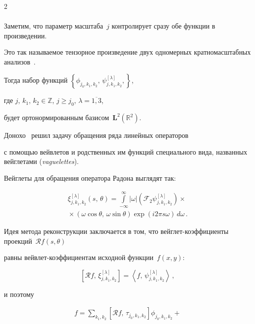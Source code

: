 \begin{multicols}{2}
\begin{align*}
\end{align*}


Заметим, что параметр масштаба~$j$ контролирует сразу обе функции в произведении. 


Это так называемое тензорное произведение двух одномерных кратномасштабных анализов~\cite{Daub}. 


Тогда набор функций $\left\{ \phi_{j_0,k_1,k_2}, \, \psi^{[\lambda]}_{j,k_1,k_2}, \right\}$, 


где $j$, $k_1$, $k_2\in\mathbb{Z}$, $j\geq j_0$, $\lambda=\overline{1,3}$, 


будет ортонормированным базисом~$\mathbf{L}^2(\mathbb{R}^2)$.





Донохо~\cite{DonohoWVD} решил задачу обращения ряда линейных операторов 


с помощью вейвлетов и родственных им функций специального вида, названных вейглетами (\textit{vaguelettes}). 


Вейглеты для обращения оператора Радона выглядят так:


\begin{multline*}


\xi^{[\lambda]}_{j,k_1,k_2}(s,\,\theta)=


\int\limits_{-\infty}^\infty|\omega|\left(\mathcal{F}_2\psi^{[\lambda]}_{j,k_1,k_2}\right)\times{}\\


{}\times \left( \omega\cos\theta,\,\omega\sin\theta \right)\exp(i2\pi s\omega)\,d\omega\,.




\end{multline*}


Идея метода реконструкции заключается в том, что вейглет-коэффициенты проекций~$\mathcal{R}f(s,\theta)$ 


равны вейвлет-коэффициентам исходной функции~$f(x,y)$:


\begin{equation*}


\left[\mathcal{R}f,\,\xi^{[\lambda]}_{j,k_1,k_2}\right] = \left\langle f,\,\psi^{[\lambda]}_{j,k_1,k_2}\right\rangle\,,


\end{equation*}


и поэтому


\begin{multline}


f = \sum\limits_{k_1,k_2}\left[\mathcal{R}f,\,\tau_{j_0,k_1,k_2}\right] \phi_{j_0,k_1,k_2} +{}\\



\end{multline}
\end{multicols}
